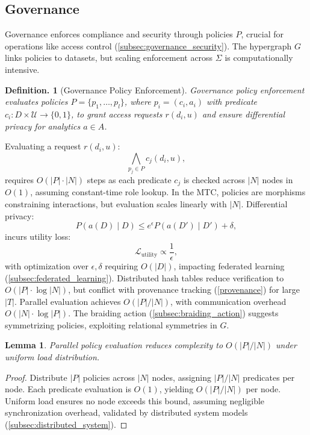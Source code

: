 \documentclass{amsart}
\newtheorem{lem}{Lemma}
\newtheorem{defn}[thm]{Definition.}
\begin{document}
\subsection{Governance} \label{subsec:governance}
Governance enforces compliance and security through policies \( P \), crucial for operations like access control (\cref{subsec:governance_security}). The hypergraph \( G \) links policies to datasets, but scaling enforcement across \( \Sigma \) is computationally intensive.

\begin{defn}[Governance Policy Enforcement]
Governance policy enforcement evaluates policies \( P = \{p_1, \dots, p_l\} \), where \( p_i = (c_i, a_i) \) with predicate \( c_i: D \times \mathcal{U} \to \{0, 1\} \), to grant access requests \( r(d_i, u) \) and ensure differential privacy for analytics \( a \in A \).
\end{defn}

Evaluating a request \( r(d_i, u) \):
\[
\bigwedge_{p_j \in P} c_j(d_i, u),
\]
requires   $O(|P| \cdot |N|)$ steps
as each predicate \( c_j \) is checked across \( |N| \) nodes in \( O(1) \), assuming constant-time role lookup. In the MTC, policies are morphisms constraining interactions, but evaluation scales linearly with \( |N| \). Differential privacy:
\[
P(a(D) \mid D) \leq e^\epsilon P(a(D') \mid D') + \delta,
\]
incurs utility loss:
\[
\mathcal{L}_{\text{utility}} \propto \frac{1}{\epsilon},
\]
with optimization over \( \epsilon, \delta \) requiring \( O(|D|) \), impacting federated learning (\cref{subsec:federated_learning}). Distributed hash tables reduce verification to \( O(|P| \cdot \log |N|) \), but conflict with provenance tracking (\cref{provenance}) for large \( |T| \). Parallel evaluation achieves \( O(|P| / |N|) \), with communication overhead \( O(|N| \cdot \log |P|) \). The braiding action (\cref{subsec:braiding_action}) suggests symmetrizing policies, exploiting relational symmetries in \( G \).

\begin{lem} \label{lem:policy_parallel}
Parallel policy evaluation reduces complexity to \( O(|P| / |N|) \) under uniform load distribution.
\end{lem}

\begin{proof}
Distribute \( |P| \) policies across \( |N| \) nodes, assigning \( |P| / |N| \) predicates per node. Each predicate evaluation is \( O(1) \), yielding \( O(|P| / |N|) \) per node. Uniform load ensures no node exceeds this bound, assuming negligible synchronization overhead, validated by distributed system models (\cref{subsec:distributed_system}).
\end{proof}
\end{document}
